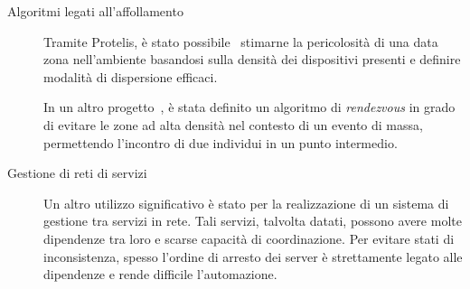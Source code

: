 \begin{description}




  \item[Algoritmi legati all'affollamento]
    Tramite Protelis, è stato possibile~\cite{BV-FOCAS2014} stimarne la pericolosità di una data zona nell'ambiente basandosi sulla densità dei dispositivi presenti e definire modalità di dispersione efficaci.

    In un altro progetto~\cite{ProtelisSAC14}, è stata definito un algoritmo di \emph{rendezvous} in grado di evitare le zone ad alta densità nel contesto di un evento di massa, permettendo l'incontro di due individui in un punto intermedio.

  \item[Gestione di reti di servizi]\cite{7306601}
    Un altro utilizzo significativo è stato per la realizzazione di un sistema di gestione tra servizi in rete.
    Tali servizi, talvolta datati, possono avere molte dipendenze tra loro e scarse capacità di coordinazione.
    Per evitare stati di inconsistenza, spesso l'ordine di arresto dei server è strettamente legato alle dipendenze e rende difficile l'automazione.


\end{description}
